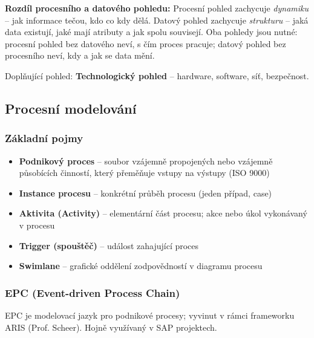 \textbf{Rozdíl procesního a datového pohledu:}
Procesní pohled zachycuje \textit{dynamiku} -- jak informace tečou, kdo co kdy dělá.
Datový pohled zachycuje \textit{strukturu} -- jaká data existují, jaké mají atributy a jak spolu souvisejí.
Oba pohledy jsou nutné: procesní pohled bez datového neví, s čím proces pracuje;
datový pohled bez procesního neví, kdy a jak se data mění.

Doplňující pohled: \textbf{Technologický pohled} -- hardware, software, síť, bezpečnost.

\subsection{Procesní modelování}

\subsubsection{Základní pojmy}

\begin{itemize}
  \item \textbf{Podnikový proces} -- soubor vzájemně propojených nebo vzájemně působících činností,
    který přeměňuje vstupy na výstupy (ISO 9000)
  \item \textbf{Instance procesu} -- konkrétní průběh procesu (jeden případ, case)
  \item \textbf{Aktivita (Activity)} -- elementární část procesu; akce nebo úkol vykonávaný v procesu
  \item \textbf{Trigger (spouštěč)} -- událost zahajující proces
  \item \textbf{Swimlane} -- grafické oddělení zodpovědností v diagramu procesu
\end{itemize}

\subsubsection{EPC (Event-driven Process Chain)}

EPC je modelovací jazyk pro podnikové procesy; vyvinut v rámci frameworku ARIS (Prof. Scheer).
Hojně využívaný v SAP projektech.

